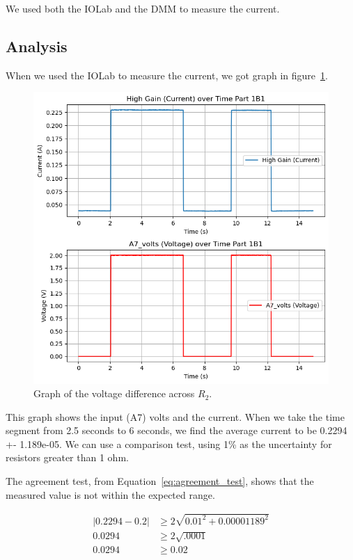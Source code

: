 \documentclass[11pt]{article}
\begin{document}
    We used both the IOLab and the DMM to measure the current.

    \subsection{Analysis}\label{subsec:current_analysis}

    When we used the IOLab to measure the current, we got graph in figure~\ref{fig:current_graph_1b1}.
    \begin{figure}[h!]
        \begin{center}
            \includegraphics[width=1.0\linewidth]{resources/images/part1b1_voltage_over_time}
        \end{center}
        \caption{Graph of the voltage difference across $R_2$.}
        \label{fig:current_graph_1b1}
    \end{figure}

    This graph shows the input (A7) volts and the current.
    When we take the time segment from 2.5 seconds to 6 seconds, we find the average current to be 0.2294 +- 1.189e-05.
    We can use a comparison test, using 1\% as the uncertainty for resistors greater than 1 ohm.

    The agreement test, from Equation~\ref{eq:agreement_test}, shows that the measured value is not within the expected range.
    \begin{e}
        \begin{align*}
            |0.2294 - 0.2| &\ge 2 \sqrt{0.01^2 + 0.00001189^2} \\
            0.0294 &\ge 2 \sqrt{.0001} \\
            0.0294 &\ge 0.02
        \end{align*}
    \end{e}
\end{document}
